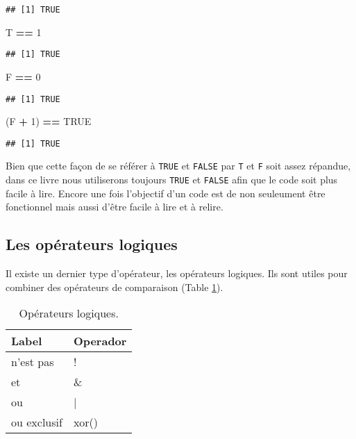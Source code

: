 \documentclass[]{book}
\newenvironment{Shaded}{\begin{snugshade}}{\end{snugshade}}
\newcommand{\DecValTok}[1]{\textcolor[rgb]{0.00,0.00,0.81}{#1}}
\newcommand{\StringTok}[1]{\textcolor[rgb]{0.31,0.60,0.02}{#1}}
\newcommand{\OtherTok}[1]{\textcolor[rgb]{0.56,0.35,0.01}{#1}}
\newcommand{\OperatorTok}[1]{\textcolor[rgb]{0.81,0.36,0.00}{\textbf{#1}}}
\newcommand{\NormalTok}[1]{#1}
\theoremstyle{definition}
\theoremstyle{definition}
\theoremstyle{definition}
\theoremstyle{remark}
\begin{document}
\begin{verbatim}
## [1] TRUE
\end{verbatim}

\begin{Shaded}
\begin{Highlighting}[]
\NormalTok{T }\OperatorTok{==}\StringTok{ }\DecValTok{1}
\end{Highlighting}
\end{Shaded}

\begin{verbatim}
## [1] TRUE
\end{verbatim}

\begin{Shaded}
\begin{Highlighting}[]
\NormalTok{F }\OperatorTok{==}\StringTok{ }\DecValTok{0}
\end{Highlighting}
\end{Shaded}

\begin{verbatim}
## [1] TRUE
\end{verbatim}

\begin{Shaded}
\begin{Highlighting}[]
\NormalTok{(F }\OperatorTok{+}\StringTok{ }\DecValTok{1}\NormalTok{) }\OperatorTok{==}\StringTok{ }\OtherTok{TRUE}
\end{Highlighting}
\end{Shaded}

\begin{verbatim}
## [1] TRUE
\end{verbatim}

Bien que cette façon de se référer à \texttt{TRUE} et \texttt{FALSE} par
\texttt{T} et \texttt{F} soit assez répandue, dans ce livre nous
utiliserons toujours \texttt{TRUE} et \texttt{FALSE} afin que le code
soit plus facile à lire. Encore une fois l'objectif d'un code est de non
seuleument être fonctionnel mais aussi d'être facile à lire et à relire.

\subsection{Les opérateurs logiques}\label{l011oplog}

Il existe un dernier type d'opérateur, les opérateurs logiques. Ils sont
utiles pour combiner des opérateurs de comparaison (Table
\ref{tab:tabOpLog}).

\begin{table}

\caption{\label{tab:tabOpLog}Opérateurs logiques.\label{tab:tabOpLog}}
\centering
\begin{tabular}[t]{l|l}
\hline
Label & Operador\\
\hline
n'est pas & !\\
\hline
et & \&\\
\hline
ou & |\\
\hline
ou exclusif & xor()\\
\hline
\end{tabular}
\end{table}
\end{document}

